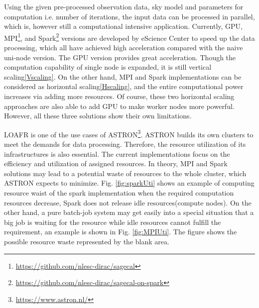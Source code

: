 Using the given pre-processed observation data, sky model and parameters for computation i.e. number of iterations, the input data can be processed in parallel, which is, however still a computational intensive application. 
Currently, GPU, MPI\footnote{\url{https://github.com/nlesc-dirac/sagecal}}, and Spark\footnote{\url{https://github.com/nlesc-dirac/sagecal-on-spark}} versions are developed by eScience Center to speed up the data processing, which all have achieved high acceleration compared with the naive uni-node version.
The GPU version provides great acceleration. 
Though the computation capability of single node is expanded, it is still vertical scaling\ref{Vscaling}.
 On the other hand, MPI and Spark implementations can be considered as horizontal scaling\ref{Hscaling}, and the entire computational power increases via adding more resources. 
 Of course, these two horizontal scaling approaches are also able to add GPU to make worker nodes more powerful. 
 However, all these three solutions show their own limitations.

LOAFR is one of the use cases of ASTRON\footnote{\url{https://www.astron.nl/}}.
ASTRON builds its own clusters to meet the demands for data processing. 
Therefore, the resource utilization of its infrastructures is also essential. 
The current implementations focus on the efficiency and utilization of assigned resources.  
In theory, MPI and Spark solutions may lead to a potential waste of resources to the whole cluster, which ASTRON expects to minimize.
Fig. \ref{fig:sparkUti} shows an example of computing resource waist of the spark implementation when the required computation resources decrease, Spark does not release idle resources(compute nodes). 
On the other hand, a pure batch-job system may get easily into a special situation that a big job is waiting for the resource while idle resources cannot fulfill the requirement, an example is shown in Fig. \ref{fig:MPIUti}. 
The figure shows the possible resource waste represented by the blank area.




